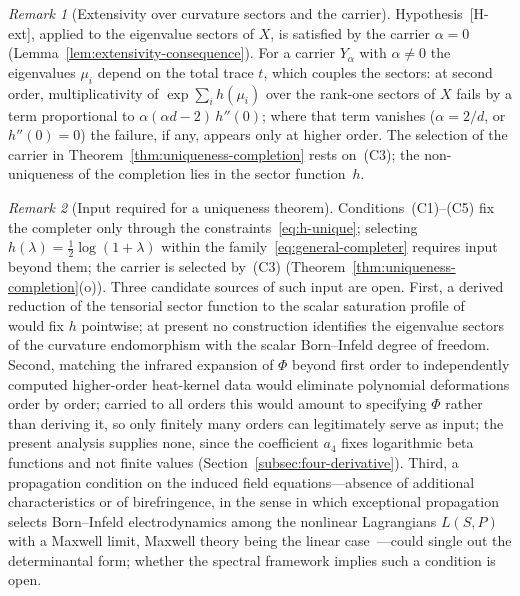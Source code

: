 \documentclass[pdflatex,sn-mathphys-num]{sn-jnl} %
\theoremstyle{remark}
\newtheorem*{remark}{Remark}
\theoremstyle{plain}
\begin{document}
    \begin{remark}[Extensivity over curvature sectors and the carrier]
      Hypothesis~[H-ext], applied to the eigenvalue sectors of $X$, is satisfied by the carrier $\alpha = 0$
      (Lemma~\ref{lem:extensivity-consequence}).
      For a carrier $Y_\alpha$ with $\alpha \neq 0$ the eigenvalues $\mu_i$ depend on the total trace $t$, which
      couples the sectors: at second order, multiplicativity of $\exp\sum_i h(\mu_i)$ over the rank-one sectors of
      $X$ fails by a term proportional to $\alpha(\alpha d - 2)\,h''(0)$; where that term vanishes ($\alpha = 2/d$, or
      $h''(0) = 0$) the failure, if any, appears only at higher order.
      The selection of the carrier in Theorem~\ref{thm:uniqueness-completion} rests on~(C3); the non-uniqueness of
      the completion lies in the sector function~$h$.
    \end{remark}

    \begin{remark}[Input required for a uniqueness theorem]
      \label{rem:uniqueness-input}
      Conditions~(C1)--(C5) fix the completer only through
      the constraints~\eqref{eq:h-unique}; selecting
      $h(\lambda) = \tfrac12\log(1+\lambda)$ within the
      family~\eqref{eq:general-completer} requires input
      beyond them; the carrier is selected by~(C3) (Theorem~\ref{thm:uniqueness-completion}(o)).
      Three candidate sources of such input are open.
      First, a derived reduction of the tensorial sector
      function to the scalar saturation profile
      of~\cite{Beau2026c} would fix $h$ pointwise; at
      present no construction identifies the eigenvalue
      sectors of the curvature endomorphism with the scalar
      Born--Infeld degree of freedom.
      Second, matching the infrared expansion of $\Phi$
      beyond first order to independently computed
      higher-order heat-kernel data would eliminate
      polynomial deformations order by order; carried to
      all orders this would amount to specifying $\Phi$
      rather than deriving it, so only finitely many orders
      can legitimately serve as input; the present analysis supplies none, since the coefficient $a_4$ fixes
      logarithmic beta functions and not finite values (Section~\ref{subsec:four-derivative}).
      Third, a propagation condition on the induced field
      equations---absence of additional characteristics or
      of birefringence, in the sense in which exceptional
      propagation selects Born--Infeld electrodynamics among
      the nonlinear Lagrangians $L(S,P)$ with a Maxwell
      limit, Maxwell theory being the linear
      case~\cite{Boillat1970,Plebanski1970}---could
      single out the determinantal form; whether the
      spectral framework implies such a condition is open.
    \end{remark}
\end{document}
